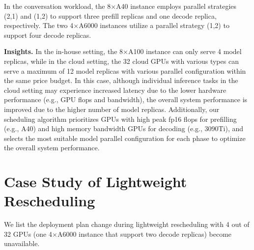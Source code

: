 In the conversation workload, the 8$\times$A40 instance employs parallel strategies (2,1) and (1,2) to support three prefill replicas and one decode replica, respectively. The two 4$\times$A6000 instances utilize a parallel strategy (1,2) to support four decode replicas. %


\noindent \textbf{Insights.} In the in-house setting, the 8$\times$A100 instance can only serve 4 model replicas, while in the cloud setting, the 32 cloud GPUs with various types can serve a maximum of 12 model replicas with various parallel configuration within the same price budget. In this case, although individual inference tasks in the cloud setting may experience increased latency due to the lower hardware performance (e.g., GPU flops and bandwidth), the overall system performance is improved due to the higher number of model replicas. Additionally, our scheduling algorithm prioritizes GPUs with high peak fp16 flops for prefilling (e.g., A40) and high memory bandwidth GPUs for decoding (e.g., 3090Ti), and selects the most suitable model parallel configuration for each phase to optimize the overall system performance. 

\section{Case Study of Lightweight Rescheduling}
\label{appendix:lightweight_rescheduling}
We list the deployment plan change during lightweight rescheduling with 4 out of 32 GPUs (one 4$\times$A6000 instance that support two decode replicas) become unavailable.

